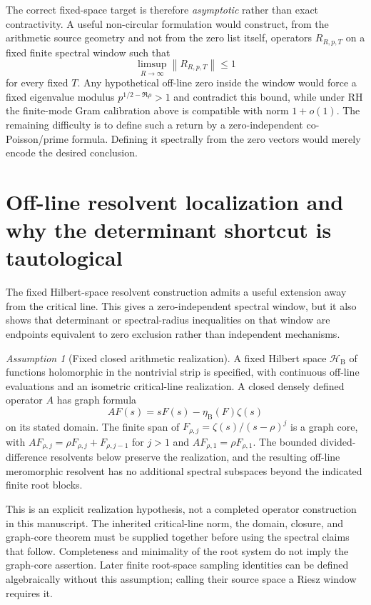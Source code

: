\documentclass[11pt]{article}
\theoremstyle{remark}
\newcommand{\norm}[1]{\left\lVert #1\right\rVert}
\newtheorem{assumption}[theorem]{Assumption}
\begin{document}
The correct fixed-space target is therefore \emph{asymptotic} rather than exact contractivity.  A useful non-circular formulation would construct, from the arithmetic source geometry and not from the zero list itself, operators $R_{R,p,T}$ on a fixed finite spectral window such that
\[
 \limsup_{R\to\infty}\norm{R_{R,p,T}}\le1
\]
for every fixed $T$.  Any hypothetical off-line zero inside the window would force a fixed eigenvalue modulus $p^{1/2-\Re\rho}>1$ and contradict this bound, while under RH the finite-mode Gram calibration above is compatible with norm $1+o(1)$.  The remaining difficulty is to define such a return by a zero-independent co-Poisson/prime formula.  Defining it spectrally from the zero vectors would merely encode the desired conclusion.


\section{Off-line resolvent localization and why the determinant shortcut is tautological}
The fixed Hilbert-space resolvent construction admits a useful extension away from the critical line.  This gives a zero-independent spectral window, but it also shows that determinant or spectral-radius inequalities on that window are endpoints equivalent to zero exclusion rather than independent mechanisms.

\begin{assumption}[Fixed closed arithmetic realization]\label{ass:closed-operator}
A fixed Hilbert space $\mathscr H_{\mathrm B}$ of functions holomorphic
in the nontrivial strip is specified, with continuous off-line evaluations
and an isometric critical-line realization. A closed densely defined
operator $A$ has graph formula
\[
 AF(s)=sF(s)-\eta_{\mathrm B}(F)\zeta(s)
\]
on its stated domain. The finite span of
$F_{\rho,j}=\zeta(s)/(s-\rho)^j$ is a graph core, with
$AF_{\rho,j}=\rho F_{\rho,j}+F_{\rho,j-1}$ for $j>1$ and
$AF_{\rho,1}=\rho F_{\rho,1}$.
The bounded divided-difference resolvents below preserve the realization,
and the resulting off-line meromorphic resolvent has no additional
spectral subspaces beyond the indicated finite root blocks.
\end{assumption}
This is an explicit realization hypothesis, not a completed operator
construction in this manuscript. The inherited critical-line norm, the
domain, closure, and graph-core theorem must be supplied together before
using the spectral claims that follow. Completeness and minimality of the
root system do not imply the graph-core assertion. Later finite root-space
sampling identities can be defined algebraically without this assumption;
calling their source space a Riesz window requires it.
\end{document}
